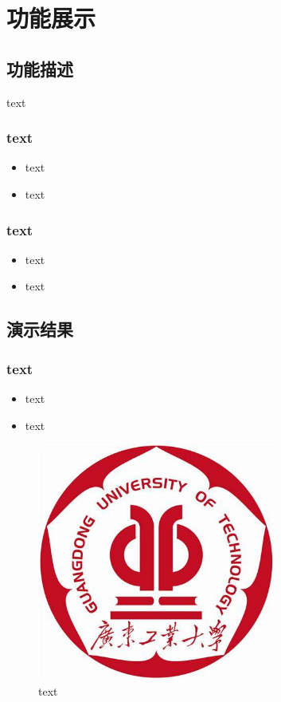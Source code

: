 
\chapter{功能展示}

\section{功能描述}
text
\subsection{text}
\begin{itemize}
    \item text
    \item text
\end{itemize}
\subsection{text}

\begin{itemize}
    \item text
    \item text
\end{itemize}
\section{演示结果}
\subsection{text}
\begin{itemize}
    \item text
    \item text
\end{itemize}
\begin{figure}[h]
    \centering
    \includegraphics[width=0.7\textwidth]{figures/logo.png}
    \caption{text}
\end{figure}

